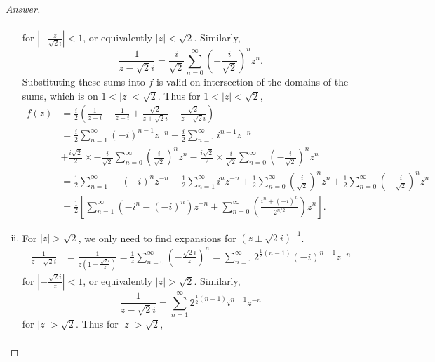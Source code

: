 \documentclass[12pt]{article}
\newcommand\inv[1]{#1^{-1}}
\newcommand\paren[1]{\left( #1 \right)}
\newcommand{\sqbrack}[1]{\left [ #1 \right ]}
\theoremstyle{definition}
\begin{document}
\begin{proof}[Answer]
\begin{enumerate}[(i)]
\begin{align*}
        \end{align*}
        for $\left| - \frac{z}{\sqrt{2}i} \right| < 1$, or equivalently $|z| < \sqrt{2}$. Similarly,
        \[
            \frac{1}{z - \sqrt{2}i} = \frac{i}{\sqrt{2}} \sum\limits_{n = 0}^{\infty} \paren{ -\frac{i}{\sqrt{2}} }^n z^n.
        \]
        Substituting these sums into $f$ is valid on intersection of the domains of the sums, which is on $1 < |z| < \sqrt{2}$. Thus for $1 < |z| < \sqrt{2}$,
        \begin{align*}
            f(z) & = \frac{i}{2} \paren{ \frac{1}{z + i} - \frac{1}{z - i} + \frac{\sqrt{2}}{z + \sqrt{2} i} - \frac{\sqrt{2}}{z - \sqrt{2} i} } \\
            & = \frac{i}{2}\sum\limits_{n = 1}^{\infty} (-i)^{n-1} z^{-n} - \frac{i}{2}\sum\limits_{n = 1}^{\infty} i^{n-1} z^{-n}  \\
            & + \frac{i\sqrt{2}}{2} \times -\frac{i}{\sqrt{2}} \sum\limits_{n = 0}^{\infty} \paren{ \frac{i}{\sqrt{2}} }^n z^n - \frac{i\sqrt{2}}{2} \times \frac{i}{\sqrt{2}} \sum\limits_{n = 0}^{\infty} \paren{ -\frac{i}{\sqrt{2}} }^n z^n \\
            & = \frac{1}{2}\sum\limits_{n = 1}^{\infty} -(-i)^{n} z^{-n} - \frac{1}{2}\sum\limits_{n = 1}^{\infty} i^{n} z^{-n} + \frac{1}{2} \sum\limits_{n = 0}^{\infty} \paren{ \frac{i}{\sqrt{2}} }^n z^n + \frac{1}{2} \sum\limits_{n = 0}^{\infty} \paren{ -\frac{i}{\sqrt{2}} }^n z^n \\
            & = \boxed{ \frac{1}{2} \sqbrack{ \sum\limits_{n = 1}^{\infty} \paren{ -i^n - (-i)^n } z^{-n} + \sum\limits_{n = 0}^{\infty} \paren{ \frac{ i^n + (-i)^n }{2^{n/2}} } z^n } . }
        \end{align*}
        \item For $|z| > \sqrt{2}$, we only need to find expansions for $\inv{ \paren{ z \pm \sqrt{2} i } }$. 
        \begin{align*}
            \frac{1}{ z + \sqrt{2}i } & = \frac{1}{z \paren{ 1 + \frac{\sqrt{2}i}{z} } } = \frac{1}{z} \sum\limits_{n = 0}^{\infty} \paren{ -\frac{\sqrt{2}i}{z} }^n= \sum\limits_{n = 1}^{\infty} 2^{ \frac{1}{2}(n-1) } (-i)^{n-1} z^{-n}
        \end{align*}
        for $\left| -\frac{\sqrt{2}i}{z} \right| < 1$, or equivalently $|z| > \sqrt{2}$. Similarly,
        \[
            \frac{1}{ z - \sqrt{2}i } = \sum\limits_{n = 1}^{\infty} 2^{ \frac{1}{2}(n-1) } i^{n-1} z^{-n}
        \]
        for $|z| > \sqrt{2}$. Thus for $|z| > \sqrt{2}$,
        \begin{align*}

\end{align*}
\end{enumerate}
\end{proof}
\end{document}
